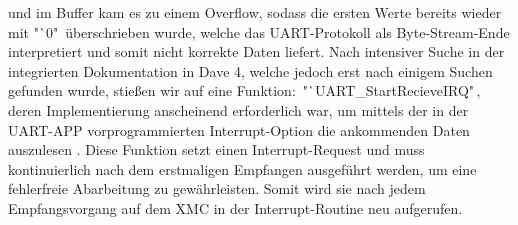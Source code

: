 \documentclass[12pt,a4paper,bibliography=totoc,listof=totoc]{scrartcl}
\begin{document}
und im Buffer kam es zu einem Overflow, sodass die ersten Werte bereits wieder mit "`0"\, überschrieben wurde, 
welche das UART-Protokoll als Byte-Stream-Ende interpretiert und somit nicht korrekte Daten liefert.
Nach intensiver Suche in der integrierten Dokumentation in Dave 4, welche jedoch erst nach einigem Suchen 
gefunden wurde, stießen wir auf eine Funktion:\, "`UART\_StartRecieveIRQ"\,, deren Implementierung anscheinend 
erforderlich war, um mittels der in der UART-APP vorprogrammierten Interrupt-Option die ankommenden Daten 
auszulesen %
. Diese Funktion setzt einen Interrupt-Request und muss 
kontinuierlich nach dem erstmaligen Empfangen ausgeführt werden, um eine fehlerfreie Abarbeitung zu 
gewährleisten. Somit wird sie nach jedem Empfangsvorgang auf dem XMC in der Interrupt-Routine neu 
aufgerufen.


\end{document}
